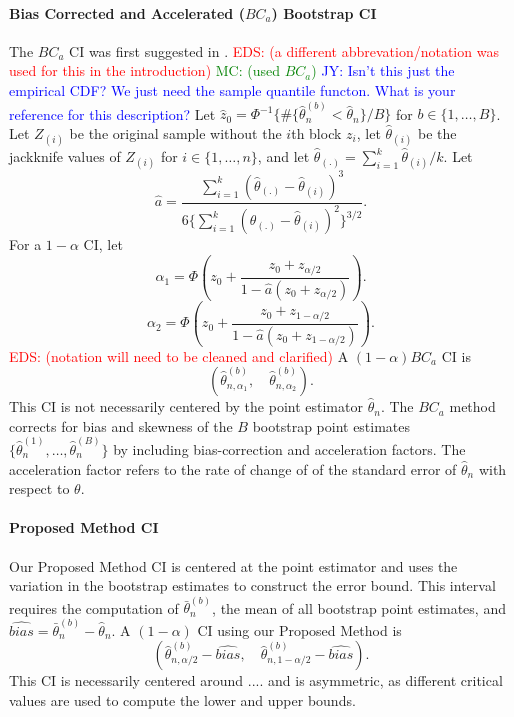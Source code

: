 \documentclass[12pt, letterpaper, titlepage]{article}
\newcommand{\jy}[1]{\textcolor{blue}{JY: #1}}
\newcommand{\eds}[1]{\textcolor{red}{EDS: (#1)}}
\newcommand{\mc}[1]{\textcolor{green}{MC: (#1)}}
\begin{document}
\paragraph{Bias Corrected and Accelerated ($BC_a$) Bootstrap CI}
The $BC_a$ CI was first suggested in \citet{efron1987better}.
\eds{a different abbrevation/notation was used for this in the introduction}
\mc{used $BC_a$}
\jy{Isn't this just the empirical CDF? We just need the sample quantile functon.
  What is your reference for this description?}
Let $\hat{z}_0 = \Phi^{-1}\{\#\{\hat\theta_n^{(b)} < \hat{\theta}_n\} / B\}$
for $b \in \{1, \ldots, B\}$. 
Let $Z_{(i)}$ be the original sample without the $i$th block $z_i$, let
$\hat{\theta}_{(i)}$ be the jackknife values of $Z_{(i)}$
for $i \in \{1, \ldots, n\}$, 
and let $\hat{\theta}_{(.)} = \sum_{i=1}^{k} \hat{\theta}_{(i)} / k$. 
Let 
\[
\hat{a} = \frac{\sum_{i=1}^{k} (\hat{\theta}_{(.)} - \hat{\theta}_{(i)})^3}{6\{\sum_{i=1}^{k} (\hat{\theta}_{(.)} - \hat{\theta}_{(i)})^2\}^{3/2}}
.\] For a $1 - \alpha$ CI, let
\[
\alpha_1 = \Phi(z_0 + \frac{z_{0} +
  z_{\alpha/2}}{1 - \hat{a}(z_{0} + z_{\alpha/2})}).
\]
\[
\alpha_2 = \Phi(z_0 + \frac{z_{0} +
  z_{1 - \alpha/2}}{1 - \hat{a}(z_{0} + z_{1 - \alpha/2})}).
\]
\eds{notation will need to be cleaned and clarified}
A $(1 - \alpha) BC_a$ CI is
\[
(\hat\theta_{n, \alpha_1}^{(b)}, \quad \hat\theta_{n, \alpha_2}^{(b)}).
\]
This CI is not necessarily centered by the point estimator $\hat\theta_n$. The
$BC_a$ method corrects for bias and skewness of the $B$ bootstrap point
estimates $\{\hat\theta_n^{(1)}, \ldots, \hat\theta_n^{(B)}\}$ by including
bias-correction and acceleration factors. The acceleration factor refers to
the 
rate of change of of the standard error of $\hat\theta_n$ with respect to
$\theta$.

\paragraph{Proposed Method CI}
Our Proposed Method CI is centered at the point estimator and uses the
variation
in the bootstrap estimates to construct the error bound. This interval requires
the computation of $\bar\theta_n^{(b)}$, the mean of all bootstrap point
estimates, and $\hat{bias} = \bar\theta_n^{(b)} - \hat\theta_n$.
A $(1 - \alpha)$ CI using our Proposed Method is
\[
(\hat\theta_{n, \alpha/2}^{(b)} - \hat{bias}, \quad
\hat\theta_{n, 1 - \alpha/2}^{(b)} - \hat{bias}).
\]
This CI is necessarily centered around .... and
is asymmetric, as different critical values are used to compute
the lower and upper bounds.
\end{document}
